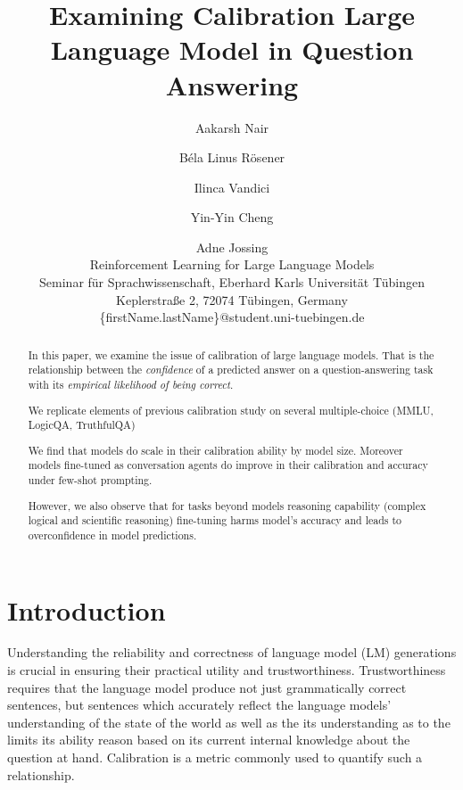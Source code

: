 \documentclass[11pt]{article}
\title{Examining Calibration Large Language Model in Question Answering}
\author{Aakarsh Nair 
    \and Béla Linus Rösener 
    \and Ilinca Vandici  
    \and Yin-Yin Cheng 
    \and Adne Jossing \\
        Reinforcement Learning for Large Language Models\\
        Seminar für Sprachwissenschaft,  Eberhard Karls Universität Tübingen \\
 Keplerstraße 2, 72074 Tübingen, Germany\\
        \{firstName.lastName\}@student.uni-tuebingen.de
}
\begin{document}
{\makeatletter\acl@finalcopytrue
  \maketitle
}


\begin{abstract}
In this paper, we examine the issue of calibration of 
large language models. 
That is the relationship between the \emph{confidence} 
of a predicted answer on a question-answering task 
with its \emph{empirical likelihood of being correct}.

We replicate elements of previous calibration study 
\cite{kadavath2022language} on several multiple-choice 
(MMLU, LogicQA, TruthfulQA) 

We find that models do scale in their calibration ability by 
model size. Moreover models fine-tuned as conversation agents 
do improve in their calibration and accuracy under 
few-shot prompting. 

However, we also observe that for tasks beyond models reasoning 
capability (complex logical and scientific reasoning) fine-tuning 
harms model's accuracy and leads to overconfidence 
in model predictions.

\end{abstract}


\section{Introduction}


Understanding the reliability and correctness of language model (LM) 
generations is crucial in ensuring their practical utility and trustworthiness.  Trustworthiness requires that the language model 
produce not just grammatically correct sentences, but sentences 
which accurately reflect the language models' understanding 
of the state of the world as well as the its understanding as to 
the limits its ability reason based on its current 
internal knowledge about the question at hand. Calibration is a metric commonly used to quantify such a relationship. 
\end{document}
